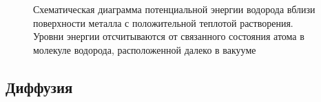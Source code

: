
\begin{figure}[ht]
    \caption{Схематическая диаграмма потенциальной энергии водорода вблизи поверхности металла с положительной теплотой растворения. Уровни энергии отсчитываются от связанного состояния атома в молекуле водорода, расположенной далеко в вакууме}\label{fig:ch1/potential_diagram_all}
\end{figure}

\subsection{Диффузия}

